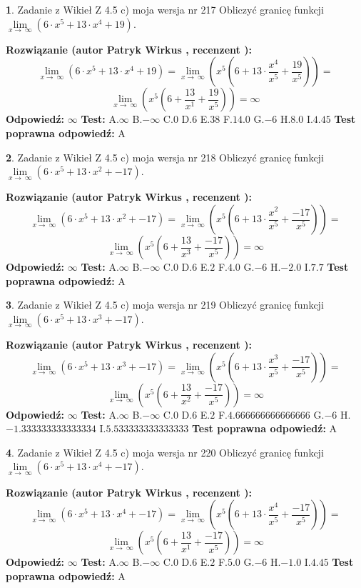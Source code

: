 \documentclass[12pt, a4paper]{article}
\theoremstyle{definition} %
\newtheorem{zad}{}
\newcommand{\zadStart}[1]{\begin{zad}#1\newline}
\newcommand{\zadStop}{\end{zad}}
\newcommand{\rozwStart}[2]{\noindent \textbf{Rozwiązanie (autor #1 , recenzent #2): }\newline}
\newcommand{\rozwStop}{\newline}
\newcommand{\odpStart}{\noindent \textbf{Odpowiedź:}\newline}
\newcommand{\odpStop}{\newline}
\newcommand{\testStart}{\noindent \textbf{Test:}\newline}
\newcommand{\testStop}{\newline}
\newcommand{\kluczStart}{\noindent \textbf{Test poprawna odpowiedź:}\newline}
\newcommand{\kluczStop}{\newline}
\begin{document}
\zadStart{Zadanie z Wikieł Z 4.5 c) moja wersja nr 217}
Obliczyć granicę funkcji  $\lim\limits_{x\to\ \infty}(6 \cdot x^{5}+13 \cdot x^{4}+19)$.
\zadStop
\rozwStart{Patryk Wirkus}{}
$$\lim\limits_{x\to\ \infty}(6 \cdot x^{5}+13 \cdot x^{4}+19) = \lim\limits_{x\to\ \infty}(x^{5}(6 +13 \cdot \frac{x^{4}}{x^{5}}+\frac{19}{x^{5}})) =$$ $$\lim\limits_{x\to\ \infty}(x^{5}(6 +\frac{13}{x^{1}}+\frac{19}{x^{5}})) =\infty$$
\rozwStop
\odpStart
$\infty$
\odpStop
\testStart
A.$\infty$ B.$-\infty$ C.$0$ D.$6$ E.$38$
F.$14.0$ G.$-6$
H.$8.0$
I.$4.45$
\testStop
\kluczStart
A
\kluczStop



\zadStart{Zadanie z Wikieł Z 4.5 c) moja wersja nr 218}
Obliczyć granicę funkcji  $\lim\limits_{x\to\ \infty}(6 \cdot x^{5}+13 \cdot x^{2}+-17)$.
\zadStop
\rozwStart{Patryk Wirkus}{}
$$\lim\limits_{x\to\ \infty}(6 \cdot x^{5}+13 \cdot x^{2}+-17) = \lim\limits_{x\to\ \infty}(x^{5}(6 +13 \cdot \frac{x^{2}}{x^{5}}+\frac{-17}{x^{5}})) =$$ $$\lim\limits_{x\to\ \infty}(x^{5}(6 +\frac{13}{x^{3}}+\frac{-17}{x^{5}})) =\infty$$
\rozwStop
\odpStart
$\infty$
\odpStop
\testStart
A.$\infty$ B.$-\infty$ C.$0$ D.$6$ E.$2$
F.$4.0$ G.$-6$
H.$-2.0$
I.$7.7$
\testStop
\kluczStart
A
\kluczStop



\zadStart{Zadanie z Wikieł Z 4.5 c) moja wersja nr 219}
Obliczyć granicę funkcji  $\lim\limits_{x\to\ \infty}(6 \cdot x^{5}+13 \cdot x^{3}+-17)$.
\zadStop
\rozwStart{Patryk Wirkus}{}
$$\lim\limits_{x\to\ \infty}(6 \cdot x^{5}+13 \cdot x^{3}+-17) = \lim\limits_{x\to\ \infty}(x^{5}(6 +13 \cdot \frac{x^{3}}{x^{5}}+\frac{-17}{x^{5}})) =$$ $$\lim\limits_{x\to\ \infty}(x^{5}(6 +\frac{13}{x^{2}}+\frac{-17}{x^{5}})) =\infty$$
\rozwStop
\odpStart
$\infty$
\odpStop
\testStart
A.$\infty$ B.$-\infty$ C.$0$ D.$6$ E.$2$
F.$4.666666666666666$ G.$-6$
H.$-1.333333333333334$
I.$5.533333333333333$
\testStop
\kluczStart
A
\kluczStop



\zadStart{Zadanie z Wikieł Z 4.5 c) moja wersja nr 220}
Obliczyć granicę funkcji  $\lim\limits_{x\to\ \infty}(6 \cdot x^{5}+13 \cdot x^{4}+-17)$.
\zadStop
\rozwStart{Patryk Wirkus}{}
$$\lim\limits_{x\to\ \infty}(6 \cdot x^{5}+13 \cdot x^{4}+-17) = \lim\limits_{x\to\ \infty}(x^{5}(6 +13 \cdot \frac{x^{4}}{x^{5}}+\frac{-17}{x^{5}})) =$$ $$\lim\limits_{x\to\ \infty}(x^{5}(6 +\frac{13}{x^{1}}+\frac{-17}{x^{5}})) =\infty$$
\rozwStop
\odpStart
$\infty$
\odpStop
\testStart
A.$\infty$ B.$-\infty$ C.$0$ D.$6$ E.$2$
F.$5.0$ G.$-6$
H.$-1.0$
I.$4.45$
\testStop
\kluczStart
A
\kluczStop
\end{document}
